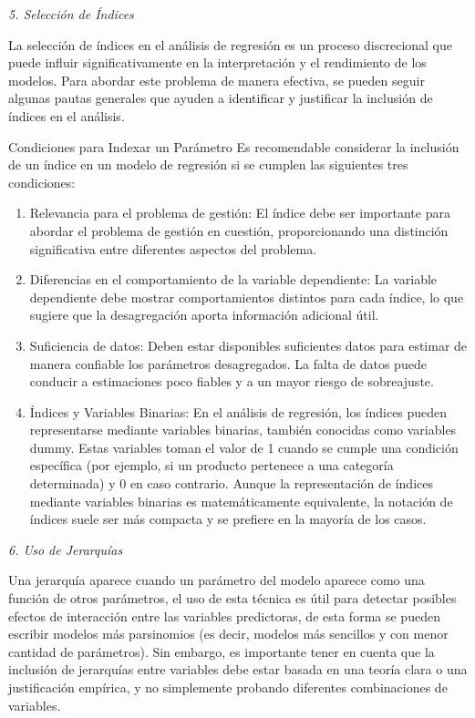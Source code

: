 \documentclass[
]{book}
\begin{document}
\emph{5. Selección de Índices}

La selección de índices en el análisis de regresión es un proceso
discrecional que puede influir significativamente en la interpretación y
el rendimiento de los modelos. Para abordar este problema de manera
efectiva, se pueden seguir algunas pautas generales que ayuden a
identificar y justificar la inclusión de índices en el análisis.

Condiciones para Indexar un Parámetro Es recomendable considerar la
inclusión de un índice en un modelo de regresión si se cumplen las
siguientes tres condiciones:

\begin{enumerate}
\def\labelenumi{\alph{enumi})}
\item
  Relevancia para el problema de gestión: El índice debe ser
  importante para abordar el problema de gestión en cuestión,
  proporcionando una distinción significativa entre diferentes
  aspectos del problema.
\item
  Diferencias en el comportamiento de la variable dependiente: La
  variable dependiente debe mostrar comportamientos distintos para
  cada índice, lo que sugiere que la desagregación aporta información
  adicional útil.
\item
  Suficiencia de datos: Deben estar disponibles suficientes datos para
  estimar de manera confiable los parámetros desagregados. La falta de
  datos puede conducir a estimaciones poco fiables y a un mayor riesgo
  de sobreajuste.
\item
  Índices y Variables Binarias: En el análisis de regresión, los
  índices pueden representarse mediante variables binarias, también
  conocidas como variables dummy. Estas variables toman el valor de 1
  cuando se cumple una condición específica (por ejemplo, si un
  producto pertenece a una categoría determinada) y 0 en caso
  contrario. Aunque la representación de índices mediante variables
  binarias es matemáticamente equivalente, la notación de índices
  suele ser más compacta y se prefiere en la mayoría de los casos.
\end{enumerate}

\emph{6. Uso de Jerarquías}

Una jerarquía aparece cuando un parámetro del modelo aparece como una
función de otros parámetros, el uso de esta técnica es útil para
detectar posibles efectos de interacción entre las variables
predictoras, de esta forma se pueden escribir modelos más parsinomios
(es decir, modelos más sencillos y con menor cantidad de parámetros).
Sin embargo, es importante tener en cuenta que la inclusión de
jerarquías entre variables debe estar basada en una teoría clara o una
justificación empírica, y no simplemente probando diferentes
combinaciones de variables.
\end{document}
